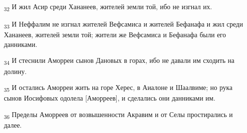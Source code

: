 \begin{tcolorbox}
\textsubscript{32} И жил Асир среди Хананеев, жителей земли той, ибо не изгнал их.
\end{tcolorbox}
\begin{tcolorbox}
\textsubscript{33} И Неффалим не изгнал жителей Вефсамиса и жителей Бефанафа и жил среди Хананеев, жителей земли той; жители же Вефсамиса и Бефанафа были его данниками.
\end{tcolorbox}
\begin{tcolorbox}
\textsubscript{34} И стеснили Аморреи сынов Дановых в горах, ибо не давали им сходить на долину.
\end{tcolorbox}
\begin{tcolorbox}
\textsubscript{35} И остались Аморреи жить на горе Херес, в Аиалоне и Шаалвиме; но рука сынов Иосифовых одолела [Аморреев], и сделались они данниками им.
\end{tcolorbox}
\begin{tcolorbox}
\textsubscript{36} Пределы Аморреев от возвышенности Акравим и от Селы простирались и далее.
\end{tcolorbox}
